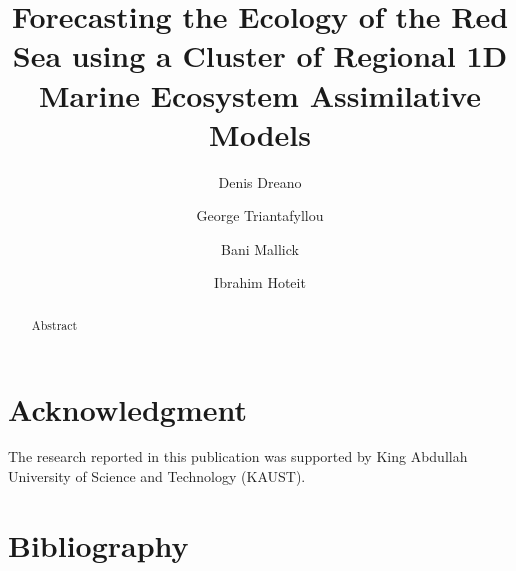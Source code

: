 \documentclass[review, authoryear]{elsarticle}
\begin{document}
\begin{frontmatter}

  \title{Forecasting the Ecology of the Red Sea using a Cluster of Regional
1D Marine Ecosystem Assimilative Models}

  \author[1]{Denis Dreano}

  \author[3]{George Triantafyllou}

  \author[2]{Bani Mallick}
  
  \author[1]{Ibrahim Hoteit}
   


  \address[1]{Computer, Electrical and Mathematical Sciences and Engineering Division, King Abdullah University of Science and Technology}

  \address[2]{Department of Statistics, Texas A\&M University}

  \address[3]{Hellenic Center for Marine Research}

  \begin{abstract}
  Abstract
  \end{abstract}

\end{frontmatter}

\linenumbers











\section*{Acknowledgment}

The research reported in this publication was supported by King Abdullah
University of Science and Technology (KAUST).

\section{Bibliography}

 
\end{document}
